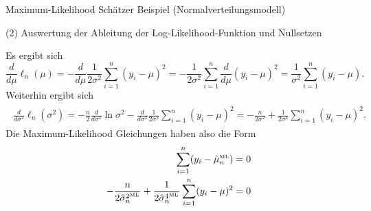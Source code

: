 \documentclass[
  8pt,
  ignorenonframetext,
]{beamer}
\begin{document}
\begin{frame}{Maximum-Likelihood Schätzer}
\protect\hypertarget{maximum-likelihood-schuxe4tzer-8}{}
Beispiel (Normalverteilungsmodell)

\small

\noindent (2) Auswertung der Ableitung der Log-Likelihood-Funktion und
Nullsetzen

\footnotesize

Es ergibt sich \begin{equation}
\frac{d}{d\mu} \ell_n(\mu)
 = - \frac{d}{d\mu} \frac{1}{2\sigma^2}\sum_{i=1}^n(y_i-\mu)^2
 = - \frac{1}{2\sigma^2}\sum_{i=1}^n \frac{d}{d\mu} (y_i-\mu)^2
 = \frac{1}{\sigma^2}\sum_{i=1}^n (y_i-\mu).
\end{equation} Weiterhin ergibt sich \begin{align}
\begin{split}
\frac{d}{d\sigma^2} \ell_n(\sigma^2)
= - \frac{n}{2} \frac{d}{d\sigma^2} \ln \sigma^2  - \frac{d}{d\sigma^2} \frac{1}{2\sigma^2}\sum_{i=1}^n(y_i-\mu)^2
= - \frac{n}{2 \sigma^2} + \frac{1}{2\sigma^4}\sum_{i=1}^n(y_i-\mu)^2.
\end{split}
\end{align} Die Maximum-Likelihood Gleichungen haben also die Form
\begin{align}
\begin{split}
\sum_{i=1}^n (y_i-\hat{\mu}_{n}^{\mbox{\tiny ML}}) & = 0 \\
- \frac{n}{2 \hat{\sigma}^{2^{\mbox{\tiny ML}}}_n} + \frac{1}{2\hat{\sigma}^{4^{\mbox{\tiny ML}}}_n}\sum_{i=1}^n(y_i-\mu)^2 & = 0
\end{split}
\end{align}
\end{frame}
\end{document}
